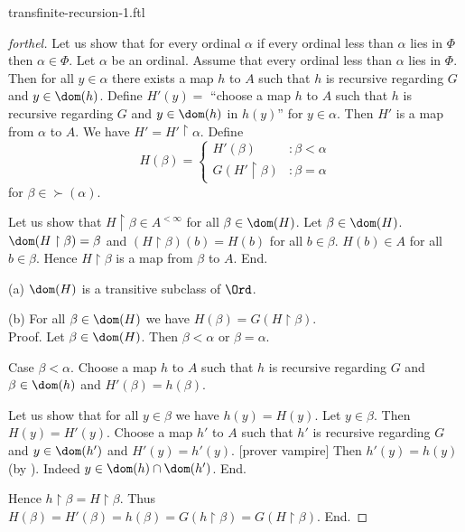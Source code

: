 \documentclass{naproche-library}
\begin{document}
\begin{smodule}{transfinite-recursion-1.ftl}
\begin{proof}[forthel]
      Let us show that for every ordinal $\alpha$ if every ordinal less than $\alpha$ lies in $\Phi$ then $\alpha \in \Phi$.
        Let $\alpha$ be an ordinal.
        Assume that every ordinal less than $\alpha$ lies in $\Phi$.
        Then for all $y \in \alpha$ there exists a map $h$ to $A$ such that $h$ is recursive regarding $G$ and $y \in \dom(h)$.
        Define $H'(y) =$ ``choose a map $h$ to $A$ such that $h$ is recursive regarding $G$ and $y \in \dom(h)$ in $h(y)$'' for $y \in \alpha$.
        Then $H'$ is a map from $\alpha$ to $A$.
        We have $H' = H' \restriction \alpha$.
        Define \[ H(\beta) =
          \begin{cases}
            H'(\beta)                 & : \beta < \alpha \\
            G(H' \restriction \beta)  & : \beta = \alpha
          \end{cases} \]
        for $\beta \in \succ(\alpha)$.
        
        Let us show that $H \restriction \beta \in A^{< \infty}$ for all $\beta \in \dom(H)$.
          Let $\beta \in \dom(H)$.
          $\dom(H \restriction \beta) = \beta$ and $(H \restriction \beta)(b) = H(b)$ for all $b \in \beta$.
          $H(b) \in A$ for all $b \in \beta$.
          Hence $H \restriction \beta$ is a map from $\beta$ to $A$.
        End.

        (a) $\dom(H)$ is a transitive subclass of $\Ord$.

        (b) For all $\beta \in \dom(H)$ we have $H(\beta) = G(H \restriction \beta)$. \\
        Proof.
          Let $\beta \in \dom(H)$.
          Then $\beta < \alpha$ or $\beta = \alpha$.

          Case $\beta < \alpha$.
            Choose a map $h$ to $A$ such that $h$ is recursive regarding $G$ and $\beta \in \dom(h)$ and $H'(\beta) = h(\beta)$.

            Let us show that for all $y \in \beta$ we have $h(y) = H(y)$.
              Let $y \in \beta$.
              Then $H(y) = H'(y)$.
              Choose a map $h'$ to $A$ such that $h'$ is recursive regarding $G$ and $y \in \dom(h')$ and $H'(y) = h'(y)$.
              [prover vampire]
              Then $h'(y) = h(y)$ (by ).
              Indeed $y \in \dom(h) \cap \dom(h')$.
            End.

            Hence $h \restriction \beta = H \restriction \beta$.
            Thus $H(\beta)
              = H'(\beta)
              = h(\beta)
              = G(h \restriction \beta)
              = G(H \restriction \beta)$.
          End.


\end{proof}
\end{smodule}
\end{document}
